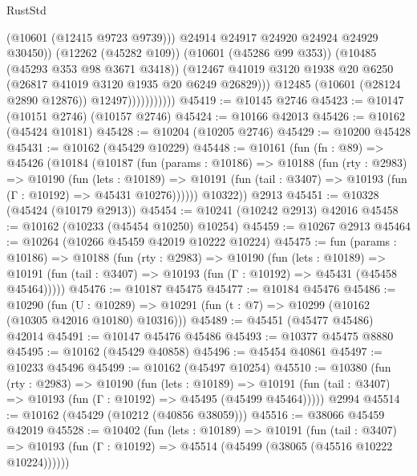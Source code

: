 \begin{lexlean}{RustStd}
\begin{coremodule}
                                  (@10601 (@12415 @9723 @9739)))
                                @24914
                                @24917
                                @24920
                                @24924
                                @24929
                                @30450))
                            (@12262 (@45282 @109))
                            (@10601 (@45286 @99 @353))
                            (@10485 (@45293 @353 @98 @3671 @3418))
                            (@12467
                              @41019
                              @3120
                              @1938
                              @20
                              @6250
                              (@26817 @41019 @3120 @1935 @20 @6249 @26829)))
                          @12485
                          (@10601 (@28124 @2890 @12876))
                          @12497)))))))))))
@45419 := @10145 @2746
@45423 := @10147 (@10151 @2746) (@10157 @2746)
@45424 := @10166 @42013
@45426 := @10162 (@45424 @10181)
@45428 := @10204 (@10205 @2746)
@45429 := @10200 @45428
@45431 := @10162 (@45429 @10229)
@45448 := @10161
    (fun (fn : @89) =>
    @45426
      (@10184
        (@10187
          (fun (params : @10186) =>
          @10188
            (fun (rty : @2983) =>
            @10190
              (fun (lets : @10189) =>
              @10191 (fun (tail : @3407) => @10193 (fun (Γ : @10192) => @45431 @10276))))))
        @10322))
    @2913
@45451 := @10328 (@45424 (@10179 @2913))
@45454 := @10241 (@10242 @2913) @42016
@45458 := @10162 (@10233 (@45454 @10250) @10254)
@45459 := @10267 @2913
@45464 := @10264 (@10266 @45459 @42019 @10222 @10224)
@45475 := fun (params : @10186) =>
  @10188
    (fun (rty : @2983) =>
    @10190
      (fun (lets : @10189) =>
      @10191 (fun (tail : @3407) => @10193 (fun (Γ : @10192) => @45431 (@45458 @45464)))))
@45476 := @10187 @45475
@45477 := @10184 @45476
@45486 := @10290
    (fun (U : @10289) => @10291 (fun (t : @7) => @10299 (@10162 (@10305 @42016 @10180) @10316)))
@45489 := @45451 (@45477 @45486) @42014
@45491 := @10147 @45476 @45486
@45493 := @10377 @45475 @8880
@45495 := @10162 (@45429 @40858)
@45496 := @45454 @40861
@45497 := @10233 @45496
@45499 := @10162 (@45497 @10254)
@45510 := @10380
    (fun (rty : @2983) =>
    @10190
      (fun (lets : @10189) =>
      @10191 (fun (tail : @3407) => @10193 (fun (Γ : @10192) => @45495 (@45499 @45464)))))
    @2994
@45514 := @10162 (@45429 (@10212 (@40856 @38059)))
@45516 := @38066 @45459 @42019
@45528 := @10402
    (fun (lets : @10189) =>
    @10191
      (fun (tail : @3407) =>
      @10193 (fun (Γ : @10192) => @45514 (@45499 (@38065 (@45516 @10222 @10224))))))

\end{coremodule}
\end{lexlean}
